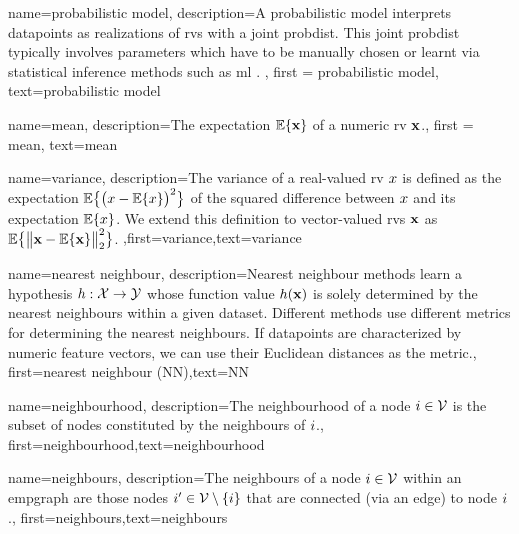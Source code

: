 {
	name=probabilistic model,
	description={A probabilistic model interprets \gls{datapoint}s 
		as \gls{realization}s of \gls{rv}s with a joint \gls{probdist}. This joint \gls{probdist} typically 
		involves parameters which have to be manually chosen or learnt via statistical inference 
		methods such as \gls{ml} \cite{LC}. }, 
	first = {probabilistic model}, text={probabilistic model} 
}



{
	name=mean,
	description={The expectation $\mathbb{E} \{ {\bf x} \}$ of a numeric \gls{rv} ${\bf x}$.}, 
		first = {mean}, text={mean} 
}

{
	name={variance},
	description={The variance of a real-valued \gls{rv} $x$ is defined as the expectation 
		$\mathbb{E}\big\{ \big( x - \mathbb{E}\{x \} \big)^{2} \big\}$ of the squared difference between $x$ 
		and its expectation $\mathbb{E}\{x \}$. We extend this definition to vector-valued \gls{rv}s ${\bf x}$ 
		as $\mathbb{E}\big\{ \big\| {\bf x} - \mathbb{E}\{{\bf x} \} \big\|_{2}^{2} \big\}$.} ,first={variance},text={variance} 
}

{
	name={nearest neighbour},
	description={Nearest neighbour methods learn a \gls{hypothesis} 
		$h: \mathcal{X} \rightarrow \mathcal{Y}$ whose function value $h({\bf x})$ 
		is solely determined by the nearest neighbours within a given \gls{dataset}. Different 
		methods use different metrics for determining the nearest neighbours. If \gls{datapoint}s 
		are characterized by numeric \gls{feature} vectors, we can use their Euclidean distances as 
		the metric.},
	first={nearest neighbour (NN)},text={NN} 
}

{
	name={neighbourhood},
	description={The neighbourhood of a node $i \in \mathcal{V}$ is 
	the subset of nodes constituted by the \gls{neighbours} of $i$.},
	first={neighbourhood},text={neighbourhood} 
}


{
	name={neighbours},
	description={The neighbours of a node $i \in \mathcal{V}$ 
	within an \gls{empgraph} are those nodes $i' \in \mathcal{V} \setminus \{ i\}$ that are connected (via an edge) to node $i$.},
	first={neighbours},text={neighbours} 
}

